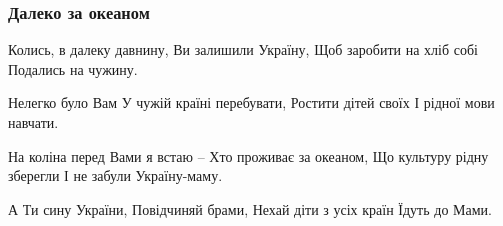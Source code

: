  
 
 

\subsubsection{Далеко за океаном}
\label{sec:poetry.rus.anastasia_lagan_1954.daleko_za_okeanom}

Колись, в далеку давнину,
Ви залишили Україну,
Щоб заробити на хліб собі
Подались на чужину.

Нелегко було Вам
У чужій країні перебувати,
Ростити дітей своїх
І рідної мови навчати.

На коліна перед Вами я встаю –
Хто проживає за океаном,
Що культуру рідну зберегли
І не забули Україну-маму.

А Ти сину України,
Повідчиняй брами,
Нехай діти з усіх країн
Їдуть до Мами. 
